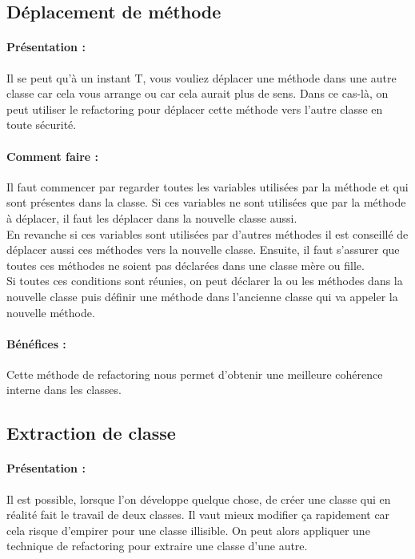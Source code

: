 \documentclass[a4paper,twoside,12pt,openright]{report}
\begin{document}
\subsection{Déplacement de méthode}
\paragraph{Présentation :}
Il se peut qu'à un instant T, vous vouliez déplacer une méthode dans une autre classe car cela vous arrange ou car cela aurait plus de sens. Dans ce cas-là, on peut utiliser le refactoring pour déplacer cette méthode vers l'autre classe en toute sécurité.

\paragraph{Comment faire :}
Il faut commencer par regarder toutes les variables utilisées par la méthode et qui sont présentes dans la classe. Si ces variables ne sont utilisées que par la méthode à déplacer, il faut les déplacer dans la nouvelle classe aussi.\\
En revanche si ces variables sont utilisées par d'autres méthodes il est conseillé de déplacer aussi ces méthodes vers la nouvelle classe.
Ensuite, il faut s'assurer que toutes ces méthodes ne soient pas déclarées dans une classe mère ou fille.\\
Si toutes ces conditions sont réunies, on peut déclarer la ou les méthodes dans la nouvelle classe puis définir une méthode dans l'ancienne classe qui va appeler la nouvelle méthode.

\paragraph{Bénéfices :}
Cette méthode de refactoring nous permet d'obtenir une meilleure cohérence interne dans les classes.\\

\newpage

\subsection{Extraction de classe}
\paragraph{Présentation :}
Il est possible, lorsque l'on développe quelque chose, de créer une classe qui en réalité fait le travail de deux classes. Il vaut mieux modifier ça rapidement car cela risque d'empirer pour une classe illisible. On peut alors appliquer une technique de refactoring pour extraire une classe d'une autre.
\end{document}
